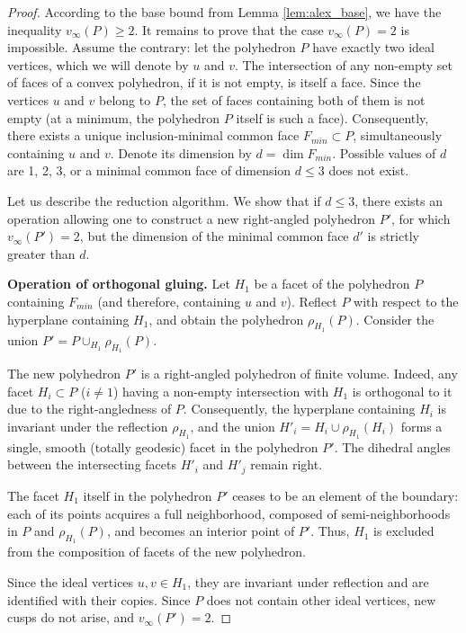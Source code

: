 \documentclass[12pt]{amsart}
\theoremstyle{definition}
\begin{document}
	\begin{proof}
		According to the base bound from Lemma \ref{lem:alex_base}, we have the inequality $v_\infty(P) \ge 2$. It remains to prove that the case $v_\infty(P) = 2$ is impossible. Assume the contrary: let the polyhedron $P$ have exactly two ideal vertices, which we will denote by $u$ and $v$. The intersection of any non-empty set of faces of a convex polyhedron, if it is not empty, is itself a face. Since the vertices $u$ and $v$ belong to $P$, the set of faces containing both of them is not empty (at a minimum, the polyhedron $P$ itself is such a face). Consequently, there exists a unique inclusion-minimal common face $F_{min} \subset P$, simultaneously containing $u$ and $v$. Denote its dimension by $d = \dim F_{min}$. Possible values of $d$ are 1, 2, 3, or a minimal common face of dimension $d \le 3$ does not exist.
		
		Let us describe the reduction algorithm. We show that if $d \le 3$, there exists an operation allowing one to construct a new right-angled polyhedron $P'$, for which $v_\infty(P') = 2$, but the dimension of the minimal common face $d'$ is strictly greater than $d$.
		
		\textbf{Operation of orthogonal gluing.} Let $H_1$ be a facet of the polyhedron $P$ containing $F_{min}$ (and therefore, containing $u$ and $v$). Reflect $P$ with respect to the hyperplane containing $H_1$, and obtain the polyhedron $\rho_{H_1}(P)$. Consider the union $P' = P \cup_{H_1} \rho_{H_1}(P)$.
		
		The new polyhedron $P'$ is a right-angled polyhedron of finite volume. Indeed, any facet $H_i \subset P$ ($i \neq 1$) having a non-empty intersection with $H_1$ is orthogonal to it due to the right-angledness of $P$. Consequently, the hyperplane containing $H_i$ is invariant under the reflection $\rho_{H_1}$, and the union $H'_i = H_i \cup \rho_{H_1}(H_i)$ forms a single, smooth (totally geodesic) facet in the polyhedron $P'$. The dihedral angles between the intersecting facets $H'_i$ and $H'_j$ remain right.
		
		The facet $H_1$ itself in the polyhedron $P'$ ceases to be an element of the boundary: each of its points acquires a full neighborhood, composed of semi-neighborhoods in $P$ and $\rho_{H_1}(P)$, and becomes an interior point of $P'$. Thus, $H_1$ is excluded from the composition of facets of the new polyhedron.
		
		Since the ideal vertices $u, v \in H_1$, they are invariant under reflection and are identified with their copies. Since $P$ does not contain other ideal vertices, new cusps do not arise, and $v_\infty(P') = 2$.
		

\end{proof}
\end{document}
